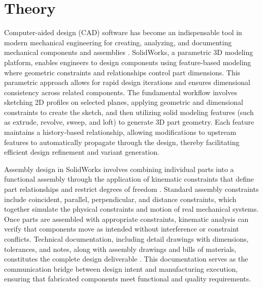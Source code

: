 \section{Theory}

Computer-aided design (CAD) software has become an indispensable tool in modern mechanical engineering for creating, analyzing, and documenting mechanical components and assemblies \cite{lab03_solidworks_guide}. SolidWorks, a parametric 3D modeling platform, enables engineers to design components using feature-based modeling where geometric constraints and relationships control part dimensions. This parametric approach allows for rapid design iterations and ensures dimensional consistency across related components. The fundamental workflow involves sketching 2D profiles on selected planes, applying geometric and dimensional constraints to create the sketch, and then utilizing solid modeling features (such as extrude, revolve, sweep, and loft) to generate 3D part geometry. Each feature maintains a history-based relationship, allowing modifications to upstream features to automatically propagate through the design, thereby facilitating efficient design refinement and variant generation.

Assembly design in SolidWorks involves combining individual parts into a functional assembly through the application of kinematic constraints that define part relationships and restrict degrees of freedom \cite{lab03_mech_design}. Standard assembly constraints include coincident, parallel, perpendicular, and distance constraints, which together simulate the physical constraints and motion of real mechanical systems. Once parts are assembled with appropriate constraints, kinematic analysis can verify that components move as intended without interference or constraint conflicts. Technical documentation, including detail drawings with dimensions, tolerances, and notes, along with assembly drawings and bills of materials, constitutes the complete design deliverable \cite{lab03_cad_design}. This documentation serves as the communication bridge between design intent and manufacturing execution, ensuring that fabricated components meet functional and quality requirements.
